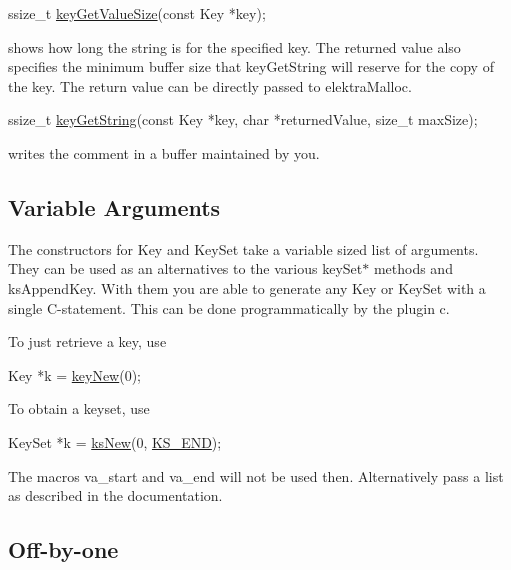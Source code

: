 \begin{DoxyCode}
ssize\_t \hyperlink{group__keyvalue_gae326672fffb7474abfe9baf53b73217e}{keyGetValueSize}(\textcolor{keyword}{const} Key *key);
\end{DoxyCode}


shows how long the string is for the specified key. The returned value also specifies the minimum buffer size that {\ttfamily key\+Get\+String} will reserve for the copy of the key. The return value can be directly passed to {\ttfamily elektra\+Malloc}.


\begin{DoxyCode}
ssize\_t \hyperlink{group__keyvalue_ga41b9fac5ccddafe407fc0ae1e2eb8778}{keyGetString}(\textcolor{keyword}{const} Key *key, \textcolor{keywordtype}{char} *returnedValue, \textcolor{keywordtype}{size\_t} maxSize);
\end{DoxyCode}


writes the comment in a buffer maintained by you.

\subsection*{Variable Arguments}

The constructors for {\ttfamily Key} and {\ttfamily Key\+Set} take a variable sized list of arguments. They can be used as an alternatives to the various {\ttfamily key\+Set$\ast$} methods and {\ttfamily ks\+Append\+Key}. With them you are able to generate any {\ttfamily Key} or {\ttfamily Key\+Set} with a single C-\/statement. This can be done programmatically by the plugin {\ttfamily c}.

To just retrieve a key, use


\begin{DoxyCode}
Key *k = \hyperlink{group__key_gad23c65b44bf48d773759e1f9a4d43b89}{keyNew}(0);
\end{DoxyCode}


To obtain a {\ttfamily keyset}, use


\begin{DoxyCode}
KeySet *k = \hyperlink{group__keyset_ga671e1aaee3ae9dc13b4834a4ddbd2c3c}{ksNew}(0, \hyperlink{kdbenum_8c_a7a28fce3773b2c873c94ac80b8b4cd54}{KS\_END});
\end{DoxyCode}


The macros {\ttfamily va\+\_\+start} and {\ttfamily va\+\_\+end} will not be used then. Alternatively pass a list as described in the documentation.

\subsection*{Off-\/by-\/one}

